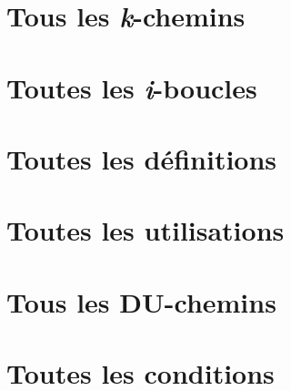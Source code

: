 \documentclass[a4paper, 12pt]{report}
\begin{document}
\section{Tous les \textit{k}-chemins}
\section{Toutes les \textit{i}-boucles}
\section{Toutes les définitions}
\section{Toutes les utilisations}
\section{Tous les DU-chemins}
\section{Toutes les conditions}
\end{document}

